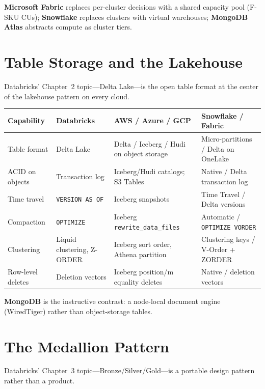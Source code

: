 \noindent \textbf{Microsoft Fabric} replaces per-cluster decisions with a shared
capacity pool (F-SKU CUs); \textbf{Snowflake} replaces clusters with virtual
warehouses; \textbf{MongoDB Atlas} abstracts compute as cluster tiers.

\section{Table Storage and the Lakehouse}
%
Databricks' Chapter~2 topic---Delta Lake---is the open table format at the center of
the lakehouse pattern on every cloud.

\begin{center}
\footnotesize
\begin{tabular}{@{}p{3.0cm}p{3.4cm}p{3.2cm}p{3.2cm}@{}}
\toprule
\textbf{Capability} & \textbf{Databricks} & \textbf{AWS / Azure / GCP} & \textbf{Snowflake / Fabric} \\
\midrule
Table format & Delta Lake & Delta / Iceberg / Hudi on object storage & Micro-partitions / Delta on OneLake \\
ACID on objects & Transaction log & Iceberg/Hudi catalogs; S3 Tables & Native / Delta transaction log \\
Time travel & \texttt{VERSION AS OF} & Iceberg snapshots & Time Travel / Delta versions \\
Compaction & \texttt{OPTIMIZE} & Iceberg \texttt{rewrite\_data\_files} & Automatic / \texttt{OPTIMIZE VORDER} \\
Clustering & Liquid clustering, Z-ORDER & Iceberg sort order, Athena partition & Clustering keys / V-Order + ZORDER \\
Row-level deletes & Deletion vectors & Iceberg position/m equality deletes & Native / deletion vectors \\
\bottomrule
\end{tabular}
\end{center}

\noindent \textbf{MongoDB} is the instructive contrast: a node-local document engine
(WiredTiger) rather than object-storage tables.

\section{The Medallion Pattern}
%
Databricks' Chapter~3 topic---Bronze/Silver/Gold---is a portable design pattern
rather than a product.


